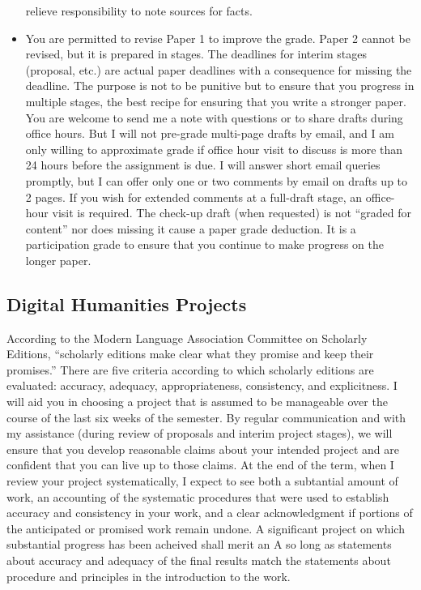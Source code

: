 \documentclass[]{article}
\begin{document}
\begin{itemize}
  relieve responsibility to note sources for facts.
\item
  You are permitted to revise Paper 1 to improve the grade. Paper 2
  cannot be revised, but it is prepared in stages. The deadlines for
  interim stages (proposal, etc.) are actual paper deadlines with a
  consequence for missing the deadline. The purpose is not to be
  punitive but to ensure that you progress in multiple stages, the best
  recipe for ensuring that you write a stronger paper. You are welcome
  to send me a note with questions or to share drafts during office
  hours. But I will not pre-grade multi-page drafts by email, and I am
  only willing to approximate grade if office hour visit to discuss is
  more than 24 hours before the assignment is due. I will answer short
  email queries promptly, but I can offer only one or two comments by
  email on drafts up to 2 pages. If you wish for extended comments at a
  full-draft stage, an office-hour visit is required. The check-up draft
  (when requested) is not ``graded for content'' nor does missing it
  cause a paper grade deduction. It is a participation grade to ensure
  that you continue to make progress on the longer paper.
\end{itemize}

\subsection{Digital Humanities
Projects}\label{digital-humanities-projects}

According to the Modern Language Association Committee on Scholarly
Editions, ``scholarly editions make clear what they promise and keep
their promises.'' There are five criteria according to which scholarly
editions are evaluated: accuracy, adequacy, appropriateness,
consistency, and explicitness. I will aid you in choosing a project that
is assumed to be manageable over the course of the last six weeks of the
semester. By regular communication and with my assistance (during review
of proposals and interim project stages), we will ensure that you
develop reasonable claims about your intended project and are confident
that you can live up to those claims. At the end of the term, when I
review your project systematically, I expect to see both a subtantial
amount of work, an accounting of the systematic procedures that were
used to establish accuracy and consistency in your work, and a clear
acknowledgment if portions of the anticipated or promised work remain
undone. A significant project on which substantial progress has been
acheived shall merit an A so long as statements about accuracy and
adequacy of the final results match the statements about procedure and
principles in the introduction to the work.
\end{document}
